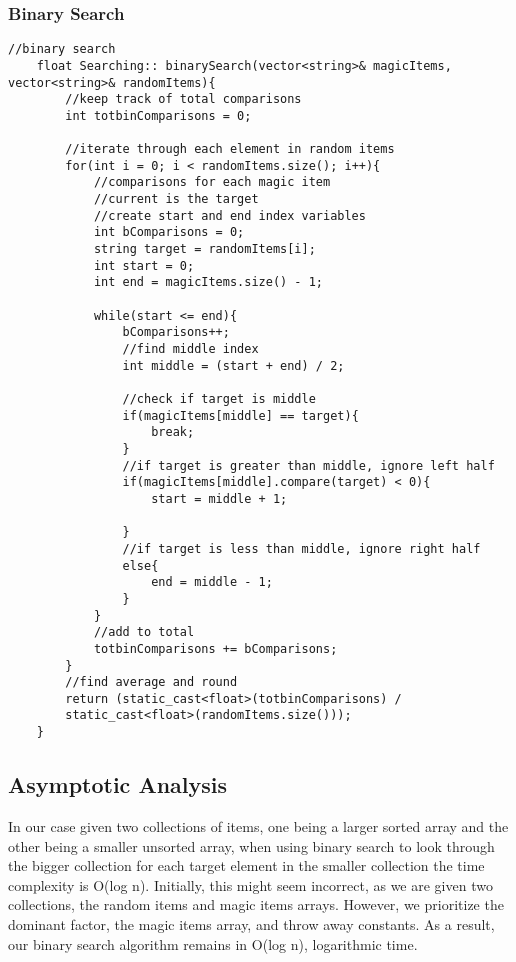 \documentclass[letterpaper, 10pt,DIV=13]{scrartcl}
\numberwithin{equation}{section} %
\numberwithin{figure}{section} %
\numberwithin{table}{section} %
\begin{document}
\subsubsection*{Binary Search}
    \lstset{numbers=left, numberstyle=\tiny, stepnumber=1, numbersep=5pt, basicstyle=\footnotesize\ttfamily}
    \begin{lstlisting}[frame=single, ]
    //binary search
    float Searching:: binarySearch(vector<string>& magicItems, vector<string>& randomItems){
        //keep track of total comparisons
        int totbinComparisons = 0;
        
        //iterate through each element in random items
        for(int i = 0; i < randomItems.size(); i++){
            //comparisons for each magic item
            //current is the target
            //create start and end index variables
            int bComparisons = 0;
            string target = randomItems[i];
            int start = 0;
            int end = magicItems.size() - 1;
    
            while(start <= end){
                bComparisons++;
                //find middle index
                int middle = (start + end) / 2;
    
                //check if target is middle
                if(magicItems[middle] == target){
                    break;
                }
                //if target is greater than middle, ignore left half
                if(magicItems[middle].compare(target) < 0){
                    start = middle + 1;
    
                }
                //if target is less than middle, ignore right half
                else{
                    end = middle - 1;
                }
            }
            //add to total
            totbinComparisons += bComparisons;
        }
        //find average and round
        return (static_cast<float>(totbinComparisons) / 
        static_cast<float>(randomItems.size()));
    }

\end{lstlisting}

\subsection{Asymptotic Analysis}
In our case given two collections of items, one being a larger sorted array and the other being a smaller unsorted array, when using binary search to look through the bigger collection for each target element in the smaller collection the time complexity is O(log n). Initially, this might seem incorrect, as we are given two collections, the random items and magic items arrays. However, we prioritize the dominant factor, the magic items array, and throw away constants. As a result, our binary search algorithm remains in O(log n), logarithmic time. 
\end{document}
